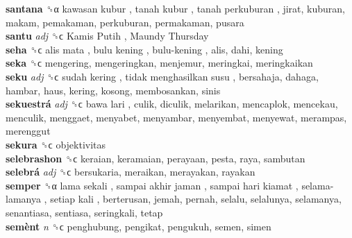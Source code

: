 \textbf{santana} ␝α   kawasan kubur ,  tanah kubur ,  tanah perkuburan , jirat, kuburan, makam, pemakaman, perkuburan, permakaman, pusara  \\
\textbf{santu} \emph{adj}  ␝ϲ   Kamis Putih ,  Maundy Thursday   \\
\textbf{seha} ␝ϲ   alis mata ,  bulu kening ,  bulu-kening , alis, dahi, kening  \\
\textbf{seka} ␝ϲ  mengering, mengeringkan, menjemur, meringkai, meringkaikan  \\
\textbf{seku} \emph{adj}  ␝ϲ   sudah kering ,  tidak menghasilkan susu , bersahaja, dahaga, hambar, haus, kering, kosong, membosankan, sinis  \\
\textbf{sekuestrá} \emph{adj}  ␝ϲ   bawa lari , culik, diculik, melarikan, mencaplok, mencekau, menculik, menggaet, menyabet, menyambar, menyembat, menyewat, merampas, merenggut  \\
\textbf{sekura} ␝ϲ  objektivitas  \\
\textbf{selebrashon} ␝ϲ  keraian, keramaian, perayaan, pesta, raya, sambutan  \\
\textbf{selebrá} \emph{adj}  ␝ϲ  bersukaria, meraikan, merayakan, rayakan  \\
\textbf{semper} ␝α   lama sekali ,  sampai akhir jaman ,  sampai hari kiamat ,  selama-lamanya ,  setiap kali , berterusan, jemah, pernah, selalu, selalunya, selamanya, senantiasa, sentiasa, seringkali, tetap  \\
\textbf{semènt} \emph{n}  ␝ϲ  penghubung, pengikat, pengukuh, semen, simen  \\
